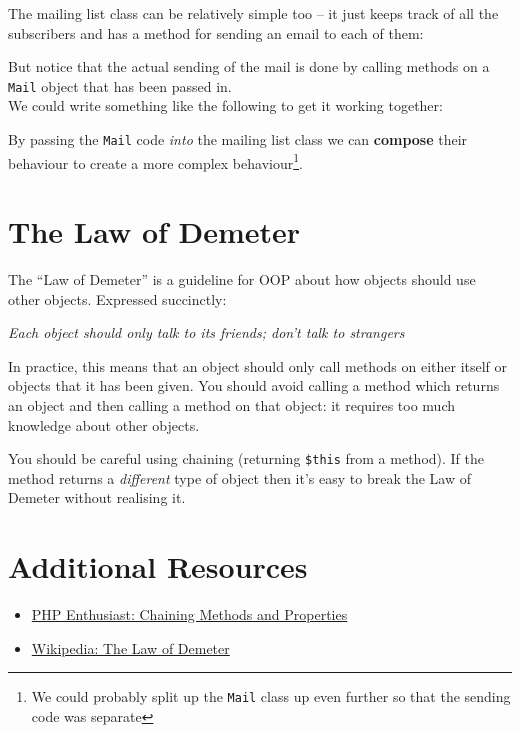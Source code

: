 The mailing list class can be relatively simple too – it just keeps track of all the subscribers and has a method for sending an email to each of them:


But notice that the actual sending of the mail is done by calling methods on a \texttt{Mail} object that has been passed in.
\\

We could write something like the following to get it working together:


By passing the \texttt{Mail} code \textit{into} the mailing list class we can \textbf{compose} their behaviour to create a more complex behaviour\footnote{We could probably split up the \texttt{Mail} class up even further so that the sending code was separate}.


\section{The Law of Demeter}

The ``Law of Demeter'' is a guideline for OOP about how objects should use other objects. Expressed succinctly:
\\

\begin{center}
    \textit{Each object should only talk to its friends; don't talk to strangers}
\end{center}
\par\bigskip


In practice, this means that an object should only call methods on either itself or objects that it has been given. You should avoid calling a method which returns an object and then calling a method on that object: it requires too much knowledge about other objects.


You should be careful using chaining (returning \texttt{\$this} from a method). If the method returns a \textit{different} type of object then it's easy to break the Law of Demeter without realising it.



\section{Additional Resources}

\begin{itemize}[leftmargin=*]
    \item \href{ https://phpenthusiast.com/object-oriented-php-tutorials/chaining-methods-and-properties}{PHP Enthusiast: Chaining Methods and Properties}
    \item \href{https://en.wikipedia.org/wiki/Law_of_Demeter}{Wikipedia: The Law of Demeter}
\end{itemize}
